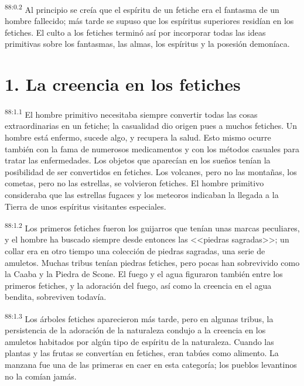 \documentclass[twoside, 11pt]{book}
\begin{document}
\par
\textsuperscript{88:0.2} Al principio se creía que el espíritu de un fetiche era el fantasma de un hombre fallecido; más tarde se supuso que los espíritus superiores residían en los fetiches. El culto a los fetiches terminó así por incorporar todas las ideas primitivas sobre los fantasmas, las almas, los espíritus y la posesión demoníaca.

\section*{1. La creencia en los fetiches}
\par
\textsuperscript{88:1.1} El hombre primitivo necesitaba siempre convertir todas las cosas extraordinarias en un fetiche; la casualidad dio origen pues a muchos fetiches. Un hombre está enfermo, sucede algo, y recupera la salud. Esto mismo ocurre también con la fama de numerosos medicamentos y con los métodos casuales para tratar las enfermedades. Los objetos que aparecían en los sueños tenían la posibilidad de ser convertidos en fetiches. Los volcanes, pero no las montañas, los cometas, pero no las estrellas, se volvieron fetiches. El hombre primitivo consideraba que las estrellas fugaces y los meteoros indicaban la llegada a la Tierra de unos espíritus visitantes especiales.

\par
\textsuperscript{88:1.2} Los primeros fetiches fueron los guijarros que tenían unas marcas peculiares, y el hombre ha buscado siempre desde entonces las <<piedras sagradas>>; un collar era en otro tiempo una colección de piedras sagradas, una serie de amuletos. Muchas tribus tenían piedras fetiches, pero pocas han sobrevivido como la Caaba y la Piedra de Scone. El fuego y el agua figuraron también entre los primeros fetiches, y la adoración del fuego, así como la creencia en el agua bendita, sobreviven todavía.

\par
\textsuperscript{88:1.3} Los árboles fetiches aparecieron más tarde, pero en algunas tribus, la persistencia de la adoración de la naturaleza condujo a la creencia en los amuletos habitados por algún tipo de espíritu de la naturaleza. Cuando las plantas y las frutas se convertían en fetiches, eran tabúes como alimento. La manzana fue una de las primeras en caer en esta categoría; los pueblos levantinos no la comían jamás.
\end{document}
